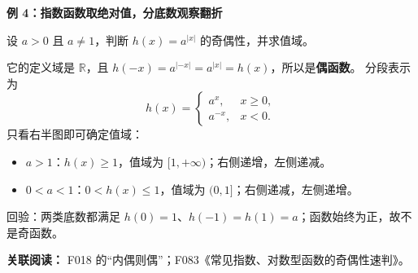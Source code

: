 \clearpage
\begin{examplebox}
\textbf{\textcolor{CExample}{例 4：指数函数取绝对值，分底数观察翻折}}

设 $a>0$ 且 $a\ne1$，判断 $h(x)=a^{|x|}$ 的奇偶性，并求值域。

它的定义域是 $\mathbb R$，且 $h(-x)=a^{|-x|}=a^{|x|}=h(x)$，所以是\textbf{偶函数}。
分段表示为
\[
h(x)=\begin{cases}a^x,&x\ge0,\\a^{-x},&x<0.\end{cases}
\]
只看右半图即可确定值域：
\begin{itemize}[leftmargin=*,itemsep=.35em]
\item $a>1$：$h(x)\ge1$，值域为 $[1,+\infty)$；右侧递增，左侧递减。
\item $0<a<1$：$0<h(x)\le1$，值域为 $(0,1]$；右侧递减，左侧递增。
\end{itemize}
回验：两类底数都满足 $h(0)=1$、$h(-1)=h(1)=a$；函数始终为正，故不是奇函数。

\textbf{关联阅读：} F018 的“内偶则偶”；F083《常见指数、对数型函数的奇偶性速判》。
\end{examplebox}
